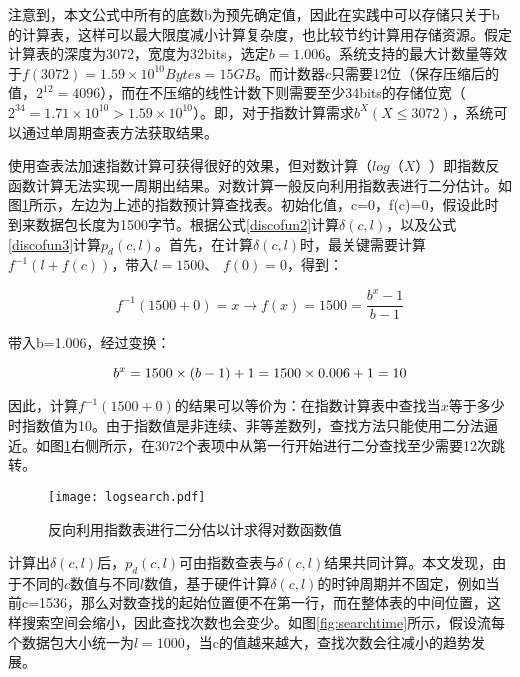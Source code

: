 注意到，本文公式中所有的底数b为预先确定值，因此在实践中可以存储只关于b的计算表，这样可以最大限度减小计算复杂度，也比较节约计算用存储资源。假定计算表的深度为3072，宽度为32bits，选定$ b=1.006 $。系统支持的最大计数量等效于$ f(3072)=1.59\times10^{10}Bytes=15GB $。而计数器$ c $只需要12位（保存压缩后的值，$ 2^{12}=4096 $），而在不压缩的线性计数下则需要至少34bits的存储位宽（$ 2^{34}=1.71\times10^{10}>1.59\times10^{10}$）。即，对于指数计算需求$b^X (X \leq 3072)$，系统可以通过单周期查表方法获取结果。


使用查表法加速指数计算可获得很好的效果，但对数计算（$ log（X） $）即指数反函数计算无法实现一周期出结果。对数计算一般反向利用指数表进行二分估计。如图\ref{fig:logsearch}所示，左边为上述的指数预计算查找表。初始化值，c=0，f(c)=0，假设此时到来数据包长度为1500字节。根据公式\ref{discofun2}计算$ \delta(c,l)$，以及公式\ref{discofun3}计算$p_d(c,l) $。首先，在计算$ \delta(c,l)$时，最关键需要计算 $ f^{-1}(l+f(c)) $，带入$ l=1500 $、 $ f(0)=0 $，得到：

\begin{equation} \label{discofun4}
f^{-1}(1500+0) = x \rightarrow f(x)=1500 = \dfrac{b^x-1}{b-1}
\end{equation}

带入b=1.006，经过变换：

\begin{equation} \label{discofun5}
b^x=1500\times(b-1)+1\\
= 1500\times 0.006+1\\
=10
\end{equation}

因此，计算$ f^{-1}(1500+0) $的结果可以等价为：在指数计算表中查找当$ x $等于多少时指数值为10。由于指数值是非连续、非等差数列，查找方法只能使用二分法逼近。如图\ref{fig:logsearch}右侧所示，在3072个表项中从第一行开始进行二分查找至少需要12次跳转。

\begin{figure}[!ht]
	\centering
	\texttt{[image: logsearch.pdf]}
	\caption{反向利用指数表进行二分估以计求得对数函数值} \label{fig:logsearch}
\end{figure}

计算出$ \delta(c,l)$后，$p_d(c,l) $可由指数查表与$ \delta(c,l)$结果共同计算。本文发现，由于不同的$ c $数值与不同$ l $数值，基于硬件计算$ \delta(c,l)$的时钟周期并不固定，例如当前c=1536，那么对数查找的起始位置便不在第一行，而在整体表的中间位置，这样搜索空间会缩小，因此查找次数也会变少。如图\ref{fig:searchtime}所示，假设流每个数据包大小统一为$ l=1000 $，当c的值越来越大，查找次数会往减小的趋势发展。

